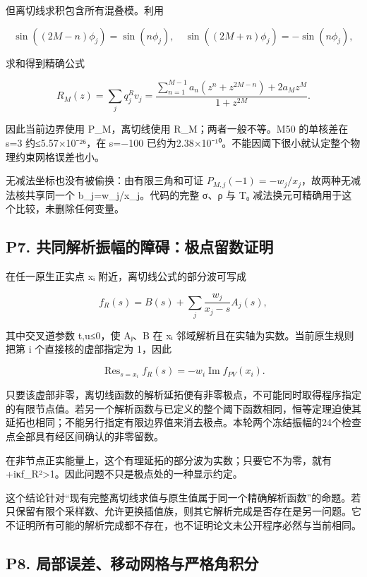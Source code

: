 \documentclass[
  11pt,
  a4paper,
]{article}
\begin{document}
但离切线求积包含所有混叠模。利用

\[
\sin((2M-n)\phi_j)=\sin(n\phi_j),\quad
\sin((2M+n)\phi_j)=-\sin(n\phi_j),
\]

求和得到精确公式

\[
R_M(z)=\sum_jq^R_jv_j
=\frac{\sum_{n=1}^{M-1}a_n(z^n+z^{2M-n})+2a_Mz^M}{1+z^{2M}}.
\tag{A}
\]

因此当前边界使用 P\_M，离切线使用 R\_M；两者一般不等。M50 的单核差在 s=3
约≤5.57×10⁻²⁶，在 s=−100
已约为2.38×10⁻¹⁰。不能因阈下很小就认定整个物理约束网格误差也小。

无减法坐标也没有被偷换：由有限三角和可证
\(P_{M,j}(-1)=-w_j/x_j\)，故两种无减法核共享同一个
b\_j=w\_j/x\_j。代码的完整 σ、ρ 与 T₀
减法换元可精确用于这个比较，未删除任何变量。

\subsection{P7.
共同解析振幅的障碍：极点留数证明}\label{p7.-ux5171ux540cux89e3ux6790ux632fux5e45ux7684ux969cux788dux6781ux70b9ux7559ux6570ux8bc1ux660e}

在任一原生正实点 xᵢ 附近，离切线公式的部分波可写成

\[
f_R(s)=B(s)+\sum_j\frac{w_j}{x_j-s}A_j(s),
\]

其中交叉道参数 t,u≤0，使 Aⱼ、B 在 xᵢ
邻域解析且在实轴为实数。当前原生规则把第 i 个直接核的虚部指定为 1，因此

\[
\boxed{\operatorname{Res}_{s=x_i}f_R(s)=-w_i\operatorname{Im}f_{PV}(x_i).}
\tag{B}
\]

只要该虚部非零，离切线函数的解析延拓便有非零极点，不可能同时取得程序指定的有限节点值。若另一个解析函数与已定义的整个阈下函数相同，恒等定理迫使其延拓也相同；不能另行指定有限边界值来消去极点。本轮两个冻结振幅的24个检查点全部具有经区间确认的非零留数。

在非节点正实能量上，这个有理延拓的部分波为实数；只要它不为零，就有
+iκf\_R\textbar²\textgreater1。因此问题不只是极点处的一种显示约定。

这个结论针对``现有完整离切线求值与原生值属于同一个精确解析函数''的命题。若只保留有限个采样数、允许更换插值族，则其它解析完成是否存在是另一问题。它不证明所有可能的解析完成都不存在，也不证明论文未公开程序必然与当前相同。

\subsection{P8.
局部误差、移动网格与严格角积分}\label{p8.-ux5c40ux90e8ux8befux5deeux79fbux52a8ux7f51ux683cux4e0eux4e25ux683cux89d2ux79efux5206}
\end{document}
